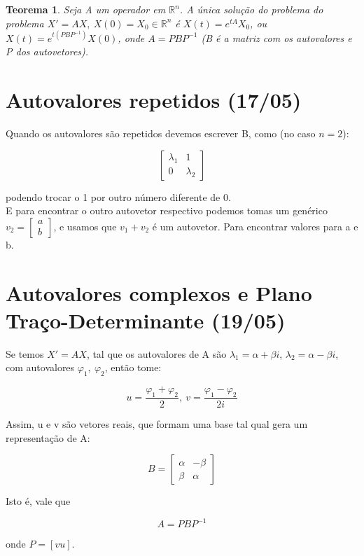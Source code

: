 \documentclass{article}
\newtheorem{theorem}{Teorema}[section]
\begin{document}
\begin{theorem}
    Seja A um operador em $\mathbb{R}^n$. A única solução do problema do problema $X' = A X, \ X(0) = X_0 \in \mathbb{R}^n$ é $X(t) = e^{tA} X_0$, ou $X(t) = e^{t (P B P^{-1})} X(0)$, onde $A = P B P^{-1}$ (B é a matriz com os autovalores e P dos autovetores).
\end{theorem}

\section*{Autovalores repetidos (17/05)}
\label{s17}
Quando os autovalores são repetidos devemos escrever B, como (no caso $n = 2$):

$$
\left [
\begin{array}{cc}
    \lambda_1 & 1 \\
    0 & \lambda_2
\end{array}
\right ]
$$

podendo trocar o 1 por outro número diferente de 0.\\

E para encontrar o outro autovetor respectivo podemos tomas um genérico $v_2 = \left [ \begin{array}{c}
     a \\
     b
\end{array}
\right ]$, e usamos que $v_1 + v_2$ é um autovetor. Para encontrar valores para a e b.

\section*{Autovalores complexos e Plano Traço-Determinante (19/05)}
\label{s18}
Se temos $X' = AX$, tal que os autovalores de A são $\lambda_1 = \alpha + \beta i$, $\lambda_2 = \alpha - \beta i$, com autovalores $\varphi_1, \ \varphi_2$, então tome:

$$u = \frac{\varphi_1 + \varphi_2}{2}, \ v = \frac{\varphi_1 - \varphi_2}{2 i}$$

Assim, u e v são vetores reais, que formam uma base tal qual gera um representação de A:

$$B = \left [ \begin{array}{cc}
    \alpha & - \beta \\
    \beta & \alpha 
\end{array} \right ]$$

Isto é, vale que

$$A = PBP^{-1}$$

onde $P = [v u]$.
\end{document}
